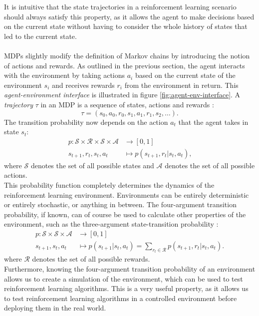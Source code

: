 It is intuitive that the state trajectories in a reinforcement learning scenario should always satisfy this property, as it allows the agent to make decisions based on the current state without having to consider the whole history of states that led to the current state.
\\
\\
MDPs slightly modify the definition of Markov chains by introducing the notion of actions and rewards.
As outlined in the previous section, the agent interacts with the environment by taking actions $a_i$ based on the current state of the environment $s_i$ and receives rewards $r_i$ from the environment in return.
This \textit{agent-environment interface} is illustrated in figure \ref{fig:agent-env-interface}.
A \textit{trajectory} $\tau$ in an MDP is a sequence of states, actions and rewards \cite[48]{sutton_reinforcement_nodate}:
\begin{equation}
    \tau = (s_0, a_0, r_0, s_1, a_1, r_1, s_2, \dots) \text{.}
    \label{eq:trajectory}
\end{equation}
The transition probability now depends on the action $a_t$ that the agent takes in state $s_t$:
\begin{align}
    p: \mathcal{S} \times \mathcal{R} \times \mathcal{S} \times \mathcal{A} &\rightarrow [0, 1] \nonumber \\
    s_{t+1}, r_t, s_t, a_t &\mapsto p(s_{t+1}, r_t | s_t, a_t) \text{,}
    \label{eq:transition-probability}
\end{align}
where $\mathcal{S}$ denotes the set of all possible states and $\mathcal{A}$ denotes the set of all possible actions.\\
This probability function completely determines the dynamics of the reinforcement learning environment.
Environments can be entirely deterministic or entirely stochastic, or anything in between.
The four-argument transition probability, if known, can of course be used to calculate other properties of the environment, such as the three-argument state-transition probability \cite[49]{sutton_reinforcement_nodate}:
\begin{align}
    p: \mathcal{S} \times \mathcal{S} \times \mathcal{A} &\rightarrow [0, 1] \nonumber \\
    s_{t+1}, s_t, a_t &\mapsto p(s_{t+1} | s_t, a_t) = \sum_{r_t \in \mathcal{R}} p(s_{t+1}, r_t | s_t, a_t) \text{.}
    \label{eq:state-transition-probability}
\end{align}
where $\mathcal{R}$ denotes the set of all possible rewards.\\
Furthermore, knowing the four-argument transition probability of an environment allows us to create a simulation of the environment, which can be used to test reinforcement learning algorithms.
This is a very useful property, as it allows us to test reinforcement learning algorithms in a controlled environment before deploying them in the real world.\\

